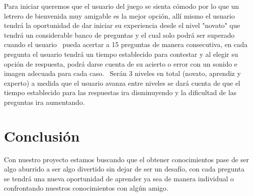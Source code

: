 \documentclass{article}
\begin{document}
Para iniciar queremos que el usuario del juego se sienta cómodo por lo que un letrero de bienvenida muy amigable es la mejor opción, allí mismo el usuario tendrá la oportunidad de dar iniciar  su experiencia  desde el nivel "novato" que tendrá un considerable banco de preguntas y el cual solo podrá ser superado cuando el usuario  pueda acertar a 15 preguntas de manera consecutiva, en cada pregunta el usuario tendrá un tiempo establecido para contestar y al elegir su opción de respuesta, podrá darse cuenta de su acierto o error con un sonido e imagen adecuada para cada caso.  Serán 3 niveles en total (novato, aprendiz y experto) a medida que el usuario avanza entre niveles se dará cuenta de que el tiempo establecido para las respuestas ira disminuyendo y la dificultad de las preguntas ira aumentando.


\newpage
\section{Conclusión}
Con nuestro proyecto estamos buscando que el obtener conocimientos pase de ser algo aburrido a ser algo divertido sin dejar de ser un desafío, con cada pregunta se tendrá una nueva oportunidad de aprender ya sea de manera individual o confrontando nuestros conocimientos con algún amigo.
\end{document}
